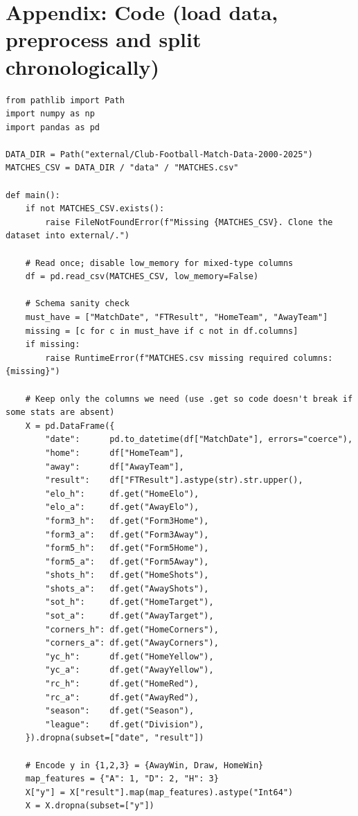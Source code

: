 \documentclass[a4paper,12pt,twoside,english]{all-in-one}
\begin{document}
\clearpage
\pagestyle{\defaultsettings}
\appendix
\section{Appendix: Code (load data, preprocess and split chronologically)}
\label{appendix}
\begin{verbatim}
from pathlib import Path
import numpy as np
import pandas as pd

DATA_DIR = Path("external/Club-Football-Match-Data-2000-2025")
MATCHES_CSV = DATA_DIR / "data" / "MATCHES.csv"

def main():
    if not MATCHES_CSV.exists():
        raise FileNotFoundError(f"Missing {MATCHES_CSV}. Clone the dataset into external/.")

    # Read once; disable low_memory for mixed-type columns
    df = pd.read_csv(MATCHES_CSV, low_memory=False)

    # Schema sanity check
    must_have = ["MatchDate", "FTResult", "HomeTeam", "AwayTeam"]
    missing = [c for c in must_have if c not in df.columns]
    if missing:
        raise RuntimeError(f"MATCHES.csv missing required columns: {missing}")

    # Keep only the columns we need (use .get so code doesn't break if some stats are absent)
    X = pd.DataFrame({
        "date":      pd.to_datetime(df["MatchDate"], errors="coerce"),
        "home":      df["HomeTeam"],
        "away":      df["AwayTeam"],
        "result":    df["FTResult"].astype(str).str.upper(),
        "elo_h":     df.get("HomeElo"),
        "elo_a":     df.get("AwayElo"),
        "form3_h":   df.get("Form3Home"),
        "form3_a":   df.get("Form3Away"),
        "form5_h":   df.get("Form5Home"),
        "form5_a":   df.get("Form5Away"),
        "shots_h":   df.get("HomeShots"),
        "shots_a":   df.get("AwayShots"),
        "sot_h":     df.get("HomeTarget"),
        "sot_a":     df.get("AwayTarget"),
        "corners_h": df.get("HomeCorners"),
        "corners_a": df.get("AwayCorners"),
        "yc_h":      df.get("HomeYellow"),
        "yc_a":      df.get("AwayYellow"),
        "rc_h":      df.get("HomeRed"),
        "rc_a":      df.get("AwayRed"),
        "season":    df.get("Season"),
        "league":    df.get("Division"),
    }).dropna(subset=["date", "result"])

    # Encode y in {1,2,3} = {AwayWin, Draw, HomeWin}
    map_features = {"A": 1, "D": 2, "H": 3}
    X["y"] = X["result"].map(map_features).astype("Int64")
    X = X.dropna(subset=["y"])


\end{verbatim}
\end{document}
